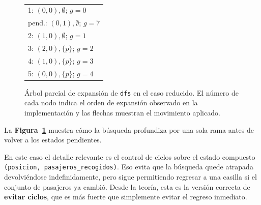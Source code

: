 \documentclass[12pt,a4paper]{article}
\newcommand{\treeopdraw}[5]{%
    \draw[movearrow] ($ (#1)!#3!(#2) + #4 $) -- ($ (#1)!#3!(#2) + #5 $);
}
\begin{document}
\begin{figure}[H]
    \centering
    \begin{minipage}{0.30\textwidth}
        \centering
        \\[0.05cm]
        {\scriptsize
        \begin{tabular}{@{}l@{}}
        1: $(0,0),\emptyset$; $g=0$ \\
        pend.: $(0,1),\emptyset$; $g=7$ \\
        2: $(1,0),\emptyset$; $g=1$ \\
        3: $(2,0),\{p\}$; $g=2$ \\
        4: $(1,0),\{p\}$; $g=3$ \\
        5: $(0,0),\{p\}$; $g=4$
        \end{tabular}}
    \end{minipage}
    \caption{Árbol parcial de expansión de \texttt{dfs} en el caso reducido. El número de cada nodo indica el orden de expansión observado en la implementación y las flechas muestran el movimiento aplicado.}
    \label{fig:dfs-reducido}
\end{figure}

La \textbf{Figura~\ref{fig:dfs-reducido}} muestra cómo la búsqueda profundiza por una sola rama antes de volver a los estados pendientes.

En este caso el detalle relevante es el control de ciclos sobre el estado compuesto \texttt{(posicion, pasajeros\_recogidos)}. Eso evita que la búsqueda quede atrapada devolviéndose indefinidamente, pero sigue permitiendo regresar a una casilla si el conjunto de pasajeros ya cambió. Desde la teoría, esta es la versión correcta de \textbf{evitar ciclos}, que es más fuerte que simplemente evitar el regreso inmediato.
\end{document}
